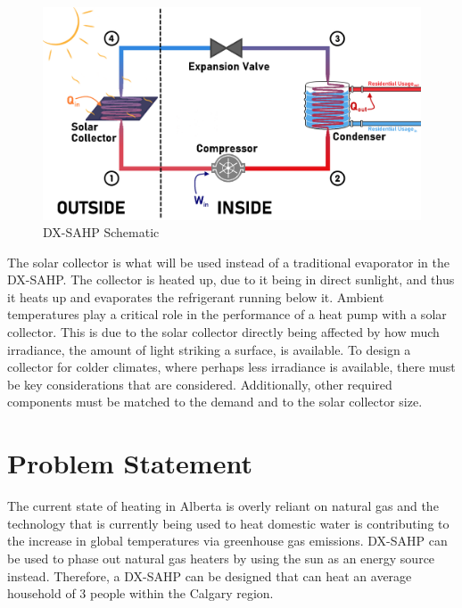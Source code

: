 \newpage
\begin{figure}[ht]
    \centering
    \includegraphics[width=\textwidth]{images/schematic.png}
    \caption{DX-SAHP Schematic}
\end{figure}
\medskip
The solar collector is what will be used instead of a traditional evaporator in the DX-SAHP. The collector is heated up, due to it being in direct sunlight, and thus it heats up and evaporates the refrigerant running below it. Ambient temperatures play a critical role in the performance of a heat pump with a solar collector. This is due to the solar collector directly being affected by how much irradiance, the amount of light striking a surface, is available. To design a collector for colder climates, where perhaps less irradiance is available, there must be key considerations that are considered. Additionally, other required components must be matched to the demand and to the solar collector size.

\section{Problem Statement}
The current state of heating in Alberta is overly reliant on natural gas and the technology that is currently being used to heat domestic water is contributing to the increase in global temperatures via greenhouse gas emissions. DX-SAHP can be used to phase out natural gas heaters by using the sun as an energy source instead. Therefore, a DX-SAHP can be designed that can heat an average household of 3 people within the Calgary region.

